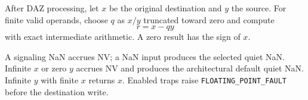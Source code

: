 After DAZ processing, let \(x\) be the original destination and \(y\) the source. For finite valid operands, choose \(q\) as \(x/y\) truncated toward zero and compute
\[
  r = x - qy
\]
with exact intermediate arithmetic. A zero result has the sign of \(x\).

A signaling NaN accrues NV; a NaN input produces the selected quiet NaN. Infinite \(x\) or zero \(y\) accrues NV and produces the architectural default quiet NaN. Infinite \(y\) with finite \(x\) returns \(x\). Enabled traps raise \texttt{FLOATING\_POINT\_FAULT} before the destination write.
